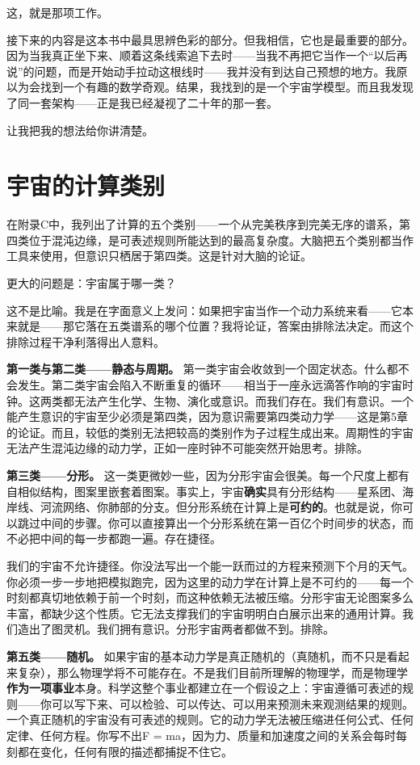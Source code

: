 \documentclass[11pt, twoside, openright]{book}
\begin{document}
这，就是那项工作。

接下来的内容是这本书中最具思辨色彩的部分。但我相信，它也是最重要的部分。因为当我真正坐下来、顺着这条线索追下去时------当我不再把它当作一个“以后再说”的问题，而是开始动手拉动这根线时------我并没有到达自己预想的地方。我原以为会找到一个有趣的数学奇观。结果，我找到的是一个宇宙学模型。而且我发现了同一套架构------正是我已经凝视了二十年的那一套。

让我把我的想法给你讲清楚。


\section*{宇宙的计算类别}

在附录C中，我列出了计算的五个类别------一个从完美秩序到完美无序的谱系，第四类位于混沌边缘，是可表述规则所能达到的最高复杂度。大脑把五个类别都当作工具来使用，但意识只栖居于第四类。这是针对大脑的论证。

更大的问题是：宇宙属于哪一类？

这不是比喻。我是在字面意义上发问：如果把宇宙当作一个动力系统来看------它本来就是------那它落在五类谱系的哪个位置？我将论证，答案由排除法决定。而这个排除过程干净利落得出人意料。

\textbf{第一类与第二类------静态与周期。} 第一类宇宙会收敛到一个固定状态。什么都不会发生。第二类宇宙会陷入不断重复的循环------相当于一座永远滴答作响的宇宙时钟。这两类都无法产生化学、生物、演化或意识。而我们存在。我们有意识。一个能产生意识的宇宙至少必须是第四类，因为意识需要第四类动力学------这是第5章的论证。而且，较低的类别无法把较高的类别作为子过程生成出来。周期性的宇宙无法产生混沌边缘的动力学，正如一座时钟不可能突然开始思考。排除。

\textbf{第三类------分形。} 这一类更微妙一些，因为分形宇宙会很美。每一个尺度上都有自相似结构，图案里嵌套着图案。事实上，宇宙\textbf{确实}具有分形结构------星系团、海岸线、河流网络、你肺部的分支。但分形系统在计算上是\textbf{可约的}。也就是说，你可以跳过中间的步骤。你可以直接算出一个分形系统在第一百亿个时间步的状态，而不必把中间的每一步都跑一遍。存在捷径。

我们的宇宙不允许捷径。你没法写出一个能一跃而过的方程来预测下个月的天气。你必须一步一步地把模拟跑完，因为这里的动力学在计算上是不可约的------每一个时刻都真切地依赖于前一个时刻，而这种依赖无法被压缩。分形宇宙无论图案多么丰富，都缺少这个性质。它无法支撑我们的宇宙明明白白展示出来的通用计算。我们造出了图灵机。我们拥有意识。分形宇宙两者都做不到。排除。

\textbf{第五类------随机。} 如果宇宙的基本动力学是真正随机的（真随机，而不只是看起来复杂），那么物理学将不可能存在。不是我们目前所理解的物理学，而是物理学\textbf{作为一项事业}本身。科学这整个事业都建立在一个假设之上：宇宙遵循可表述的规则------你可以写下来、可以检验、可以传达、可以用来预测未来观测结果的规则。一个真正随机的宇宙没有可表述的规则。它的动力学无法被压缩进任何公式、任何定律、任何方程。你写不出F = ma，因为力、质量和加速度之间的关系会每时每刻都在变化，任何有限的描述都捕捉不住它。
\end{document}

